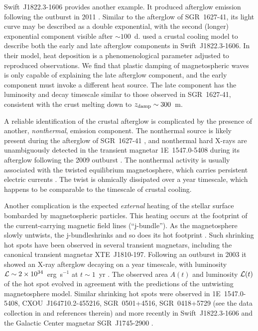 Swift~J1822.3-1606 provides another example. It produced afterglow emission following the outburst in 2011 \citep{2012ApJ...754...27R,2012ApJ...761...66S,2014ApJ...786...62S}.
Similar to the afterglow of SGR~1627-41, its light curve may be described as a double exponential, with the second (longer) exponential component visible after $\sim 100$~d. 
\citet{2014ApJ...786...62S} used a crustal cooling model to describe both the early and late afterglow components in Swift~J1822.3-1606. In their model, heat deposition is a phenomenological parameter adjusted to reproduced observations. 
We find that plastic damping of magnetospheric waves is only capable of explaining the late afterglow component, and the early component must invoke a different heat source.
The late component has the luminosity and decay timescale similar to those observed in SGR~1627-41, consistent with the crust melting down to $z_{\rm damp}\sim 300$~m.

A reliable identification of the crustal afterglow is complicated by the presence of another, {\it nonthermal}, emission component. The nonthermal source is likely present during the afterglow of SGR~1627-41 \citep{2012ApJ...757...68A}, and nonthermal hard X-rays are unambiguously detected in the transient magnetar 1E~1547.0-5408 during its afterglow following the 2009 outburst \citep{2012MNRAS.427.2824E,2012ApJ...748..133K}.
The nonthermal activity is usually associated with the twisted equilibrium magnetosphere, which carries persistent electric currents \citep{2002ApJ...574..332T,2013ApJ...762...13B}. 
The twist is ohmically dissipated over a year timescale, which happens to be comparable to the timescale of crustal cooling.

Another complication is the expected {\it external} heating of the stellar surface bombarded by magnetospheric particles. This heating occurs at the footprint of the current-carrying magnetic field lines (``j-bundle''). 
As the magnetosphere slowly untwists, the j-bundleshrinks and so does its hot footprint \citep{2009ApJ...703.1044B}. 
Such shrinking hot spots have been observed in several transient magnetars, including the canonical transient magnetar XTE~J1810-197. 
Following an outburst in 2003 it showed an X-ray afterglow decaying on a year timescale, with luminosity $\mathcal{L}\sim 2\times 10^{34}$~erg~s$^{-1}$ at $t\sim 1$~yr \citep{2007Ap&SS.308...79G}. 
The observed area $A(t)$ and luminosity $\mathcal{L}(t)$ of the hot spot evolved in agreement with the predictions of the untwisting magnetosphere model. 
Similar shrinking hot spots were observed in 1E~1547.0-5408, CXOU~J164710.2-455216, SGR~0501+4516, SGR~0418+5729 (see the data collection in \citet{2011heep.conf..299B} and references therein) and more recently in Swift~J1822.3-1606 \citep{2014ApJ...786...62S} and the Galactic Center magnetar SGR~J1745-2900 \citep{2015MNRAS.449.2685C}.

